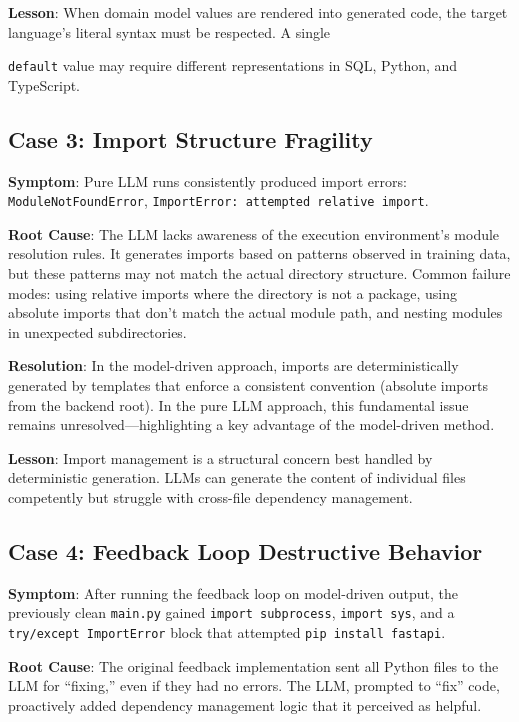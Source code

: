 \documentclass[11pt,a4paper]{article}
\begin{document}
{\textbf{Lesson}: When domain model values are rendered into generated code, the target language's literal syntax must be respected. A single {\lstinline|default| value may require different representations in SQL, Python, and TypeScript.

\subsection{Case 3: Import Structure Fragility}

\textbf{Symptom}: Pure LLM runs consistently produced import errors: {\lstinline|ModuleNotFoundError|}, {\lstinline|ImportError: attempted relative import|}.

\textbf{Root Cause}: The LLM lacks awareness of the execution environment's module resolution rules. It generates imports based on patterns observed in training data, but these patterns may not match the actual directory structure. Common failure modes: using relative imports where the directory is not a package, using absolute imports that don't match the actual module path, and nesting modules in unexpected subdirectories.

\textbf{Resolution}: In the model-driven approach, imports are deterministically generated by templates that enforce a consistent convention (absolute imports from the backend root). In the pure LLM approach, this fundamental issue remains unresolved---highlighting a key advantage of the model-driven method.

\textbf{Lesson}: Import management is a structural concern best handled by deterministic generation. LLMs can generate the content of individual files competently but struggle with cross-file dependency management.

\subsection{Case 4: Feedback Loop Destructive Behavior}

\textbf{Symptom}: After running the feedback loop on model-driven output, the previously clean {\lstinline|main.py|} gained {\lstinline|import subprocess|}, {\lstinline|import sys|}, and a {\lstinline|try/except ImportError|} block that attempted {\lstinline|pip install fastapi|}.

\textbf{Root Cause}: The original feedback implementation sent all Python files to the LLM for ``fixing,'' even if they had no errors. The LLM, prompted to ``fix'' code, proactively added dependency management logic that it perceived as helpful.

}}
\end{document}
